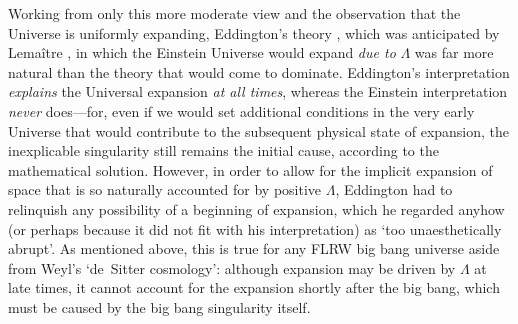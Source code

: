 Working from only this more moderate view and the observation that the Universe is uniformly expanding, Eddington's theory \cite{Eddington1930}, which was anticipated by Lema\^{i}tre \cite{Lemaitre1927,Lemaitre1931a}, in which the Einstein Universe would expand \textit{due to} $\Lambda$ was far more natural than the theory that would come to dominate. Eddington's interpretation \textit{explains} the Universal expansion \textit{at all times}, whereas the Einstein interpretation \textit{never} does---for, even if we would set additional conditions in the very early Universe that would contribute to the subsequent physical state of expansion, the inexplicable singularity still remains the initial cause, according to the mathematical solution. However, in order to allow for the implicit expansion of space that is so naturally accounted for by positive $\Lambda$, Eddington had to relinquish any possibility of a beginning of expansion, which he regarded anyhow (or perhaps because it did not fit with his interpretation) as `too unaesthetically abrupt'. As mentioned above, this is true for any FLRW big bang universe aside from Weyl's `de~Sitter cosmology': although expansion may be driven by $\Lambda$ at late times, it cannot account for the expansion shortly after the big bang, which must be caused by the big bang singularity itself.

